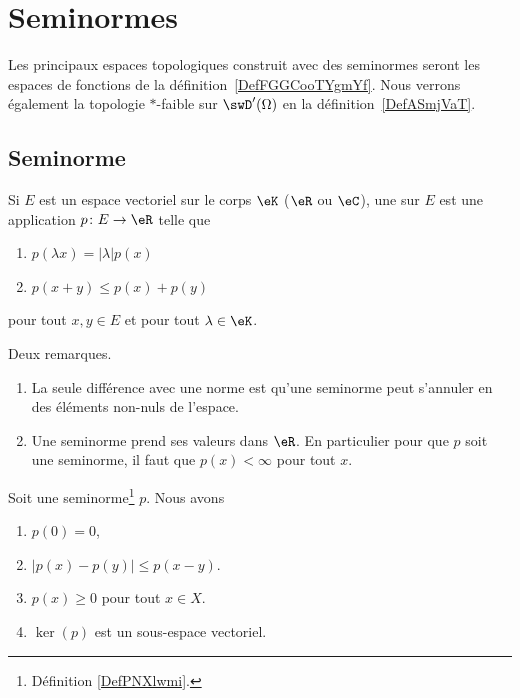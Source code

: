 \section{Seminormes}

Les principaux espaces topologiques construit avec des seminormes seront les espaces de fonctions de la définition~\ref{DefFGGCooTYgmYf}. Nous verrons également la topologie \( *\)-faible sur \( \swD'(\Omega)\) en la définition~\ref{DefASmjVaT}.

\subsection{Seminorme}

\begin{definition}  \label{DefPNXlwmi}
	Si \( E\) est un espace vectoriel sur le corps \( \eK\) (\( \eR\) ou \( \eC\)), une  sur \( E\) est une application \( p\colon E\to \eR\) telle que
	\begin{enumerate}
		\item   \label{ItemSHnimhDii}
		      \( p(\lambda x)=| \lambda |p(x)\)
		\item   \label{ItemSHnimhDiii}
		      \( p(x+y)\leq p(x)+p(y)\)
	\end{enumerate}
	pour tout \( x,y\in E\) et pour tout \( \lambda\in \eK\).
\end{definition}

\begin{remark}
	Deux remarques.
	\begin{enumerate}
		\item
		      La seule différence avec une norme est qu'une seminorme peut s'annuler en des éléments non-nuls de l'espace.
		\item
		      Une seminorme prend ses valeurs dans \( \eR\). En particulier pour que \( p\) soit une seminorme, il faut que \( p(x)<\infty\) pour tout \( x\).
	\end{enumerate}
\end{remark}


\begin{lemma}		\label{LEMooHTOAooGmRGZL}
	Soit une seminorme\footnote{Définition \ref{DefPNXlwmi}.} \( p\). Nous avons
	\begin{enumerate}
		\item		\label{ITEMooFRCRooZBWTxH}
		      \( p(0)=0\),
		\item		\label{ITEMooHVWHooAVZsTf}
		      \( | p(x)-p(y) |\leq p(x-y)\).
		\item		\label{ITEMooXCHBooDoBvpL}
		      \( p(x)\geq 0\) pour tout \( x\in X\).
		\item	\label{ITEMooQIGMooVNDakF}
		      \( \ker(p)\) est un sous-espace vectoriel.
	\end{enumerate}
\end{lemma}

